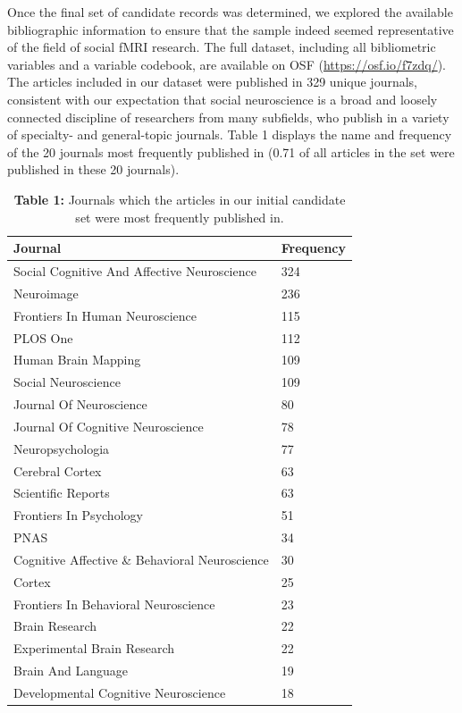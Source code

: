 \documentclass[
  man,floatsintext]{apa6}
\begin{document}
Once the final set of candidate records was determined, we explored the available bibliographic information to ensure that the sample indeed seemed representative of the field of social fMRI research. The full dataset, including all bibliometric variables and a variable codebook, are available on OSF (\url{https://osf.io/f7zdq/}). The articles included in our dataset were published in 329 unique journals, consistent with our expectation that social neuroscience is a broad and loosely connected discipline of researchers from many subfields, who publish in a variety of specialty- and general-topic journals. Table 1 displays the name and frequency of the 20 journals most frequently published in (0.71 of all articles in the set were published in these 20 journals).

\begin{table}[tbp]

\begin{center}
\begin{threeparttable}

\caption{\label{tab:tab1}\textbf{Table 1:} Journals which the articles in our initial candidate set were most frequently published in.}

\begin{tabular}{ll}
\toprule
Journal & \multicolumn{1}{c}{Frequency}\\
\midrule
Social Cognitive And Affective Neuroscience & 324\\
Neuroimage & 236\\
Frontiers In Human Neuroscience & 115\\
PLOS One & 112\\
Human Brain Mapping & 109\\
Social Neuroscience & 109\\
Journal Of Neuroscience & 80\\
Journal Of Cognitive Neuroscience & 78\\
Neuropsychologia & 77\\
Cerebral Cortex & 63\\
Scientific Reports & 63\\
Frontiers In Psychology & 51\\
PNAS & 34\\
Cognitive Affective \& Behavioral Neuroscience & 30\\
Cortex & 25\\
Frontiers In Behavioral Neuroscience & 23\\
Brain Research & 22\\
Experimental Brain Research & 22\\
Brain And Language & 19\\
Developmental Cognitive Neuroscience & 18\\
\bottomrule
\end{tabular}

\end{threeparttable}
\end{center}

\end{table}
\end{document}
